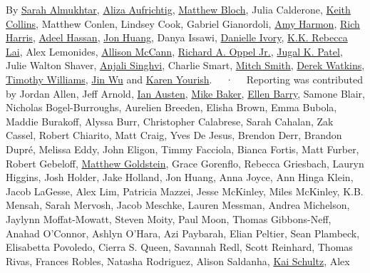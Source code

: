 By \href{https://www.nytimes.com/by/sarah-almukhtar}{Sarah Almukhtar},
\href{https://www.nytimes.com/by/aliza-aufrichtig}{Aliza Aufrichtig},
\href{https://www.nytimes.com/by/matthew-bloch}{Matthew Bloch}, Julia
Calderone, \href{https://www.nytimes.com/by/keith-collins}{Keith
Collins}, Matthew Conlen, Lindsey Cook, Gabriel Gianordoli,
\href{https://www.nytimes.com/by/amy-harmon}{Amy Harmon},
\href{https://www.nytimes.com/by/rich-harris}{Rich Harris},
\href{https://www.nytimes.com/by/adeel-hassan}{Adeel Hassan},
\href{https://www.nytimes.com/by/jon-huang}{Jon Huang}, Danya Issawi,
\href{https://www.nytimes.com/by/danielle-ivory}{Danielle Ivory},
\href{https://www.nytimes.com/by/kk-rebecca-lai}{K.K. Rebecca Lai}, Alex
Lemonides, \href{https://www.nytimes.com/by/allison-mccann}{Allison
McCann}, \href{https://www.nytimes.com/by/richard-a-oppel-jr}{Richard A.
Oppel Jr.}, \href{https://www.nytimes.com/by/jugal-k-patel}{Jugal K.
Patel}, Julie Walton Shaver,
\href{https://www.nytimes.com/by/anjali-singhvi}{Anjali Singhvi},
Charlie Smart, \href{https://www.nytimes.com/by/mitch-smith}{Mitch
Smith}, \href{https://www.nytimes.com/by/derek-watkins}{Derek Watkins},
\href{https://www.nytimes.com/by/timothy-williams}{Timothy Williams},
\href{https://www.nytimes.com/by/jin-wu}{Jin Wu} and
\href{https://www.nytimes.com/by/karen-yourish}{Karen Yourish}. ~~·~~
Reporting was contributed by Jordan Allen, Jeff Arnold,
\href{https://www.nytimes.com/by/ian-austen}{Ian Austen},
\href{https://www.nytimes.com/by/mike-baker}{Mike Baker},
\href{https://www.nytimes.com/by/ellen-barry}{Ellen Barry}, Samone
Blair, Nicholas Bogel-Burroughs, Aurelien Breeden, Elisha Brown, Emma
Bubola, Maddie Burakoff, Alyssa Burr, Christopher Calabrese, Sarah
Cahalan, Zak Cassel, Robert Chiarito, Matt Craig, Yves De Jesus, Brendon
Derr, Brandon Dupré, Melissa Eddy, John Eligon, Timmy Facciola, Bianca
Fortis, Matt Furber, Robert Gebeloff,
\href{https://www.nytimes.com/by/matthew-goldstein}{Matthew Goldstein},
Grace Gorenflo, Rebecca Griesbach, Lauryn Higgins, Josh Holder, Jake
Holland, Jon Huang, Anna Joyce, Ann Hinga Klein, Jacob LaGesse, Alex
Lim, Patricia Mazzei, Jesse McKinley, Miles McKinley, K.B. Mensah, Sarah
Mervosh, Jacob Meschke, Lauren Messman, Andrea Michelson, Jaylynn
Moffat-Mowatt, Steven Moity, Paul Moon, Thomas Gibbons-Neff, Anahad
O'Connor, Ashlyn O'Hara, Azi Paybarah, Elian Peltier, Sean Plambeck,
Elisabetta Povoledo, Cierra S. Queen, Savannah Redl, Scott Reinhard,
Thomas Rivas, Frances Robles, Natasha Rodriguez, Alison Saldanha,
\href{https://www.nytimes.com/by/kai-schultz}{Kai Schultz}, Alex
